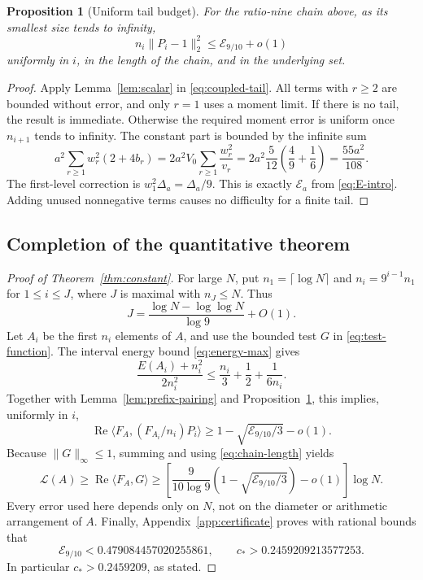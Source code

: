 \documentclass[11pt,reqno]{amsart}
\numberwithin{equation}{section}
\newtheorem{proposition}[theorem]{Proposition}
\theoremstyle{definition}
\theoremstyle{remark}
\newcommand{\La}{\mathcal L}
\newcommand{\norm}[1]{\lVert#1\rVert}
\newcommand{\ip}[2]{\langle#1,#2\rangle}
\DeclareMathOperator{\Rea}{Re}
\begin{document}
\begin{proposition}[Uniform tail budget]\label{prop:tail-budget}
For the ratio-nine chain above, as its smallest size tends to infinity,
\begin{equation}\label{eq:tail-budget}
 n_i\norm{P_i-1}_2^2\le\mathcal E_{9/10}+o(1)
\end{equation}
uniformly in $i$, in the length of the chain, and in the underlying set.
\end{proposition}
\begin{proof}
Apply Lemma~\ref{lem:scalar} in \eqref{eq:coupled-tail}. All terms with
$r\ge2$ are bounded without error, and only $r=1$ uses a moment limit.
If there is no tail, the result is immediate. Otherwise the required
moment error is uniform once $n_{i+1}$ tends to infinity. The constant
part is bounded by the infinite sum
\[
 a^2\sum_{r\ge1}w_r^2(2+4b_r)
 =2a^2V_0\sum_{r\ge1}\frac{w_r^2}{v_r}
 =2a^2\frac5{12}\left(\frac49+\frac16\right)
 =\frac{55a^2}{108}.
\]
The first-level correction is $w_1^2\Delta_a=\Delta_a/9$. This is exactly
$\mathcal E_a$ from \eqref{eq:E-intro}. Adding unused nonnegative terms
causes no difficulty for a finite tail.
\end{proof}

\subsection{Completion of the quantitative theorem}

\begin{proof}[Proof of Theorem~\ref{thm:constant}]
For large $N$, put $n_1=\lceil\log N\rceil$ and
$n_i=9^{i-1}n_1$ for $1\le i\le J$, where $J$ is maximal with
$n_J\le N$. Thus
\begin{equation}\label{eq:chain-length}
 J=\frac{\log N-\log\log N}{\log9}+O(1).
\end{equation}
Let $A_i$ be the first $n_i$ elements of $A$, and use the bounded test
$G$ in \eqref{eq:test-function}. The interval energy bound
\eqref{eq:energy-max} gives
\[
 \frac{E(A_i)+n_i^2}{2n_i^2}
 \le\frac{n_i}{3}+\frac12+\frac1{6n_i}.
\]
Together with Lemma~\ref{lem:prefix-pairing} and
Proposition~\ref{prop:tail-budget}, this implies, uniformly in $i$,
\[
 \Rea\ip{F_A}{(F_{A_i}/n_i)P_i}
 \ge1-\sqrt{\mathcal E_{9/10}/3}-o(1).
\]
Because $\norm G_\infty\le1$, summing and using
\eqref{eq:chain-length} yields
\[
 \La(A)\ge\Rea\ip{F_A}G
 \ge\left[\frac{9}{10\log9}
       \left(1-\sqrt{\mathcal E_{9/10}/3}\right)-o(1)\right]\log N.
\]
Every error used here depends only on $N$, not on the diameter or
arithmetic arrangement of $A$. Finally, Appendix~\ref{app:certificate}
proves with rational bounds that
\[
 \mathcal E_{9/10}<0.479084457020255861,
 \qquad c_*>0.2459209213577253.
\]
In particular $c_*>0.2459209$, as stated.
\end{proof}
\end{document}
